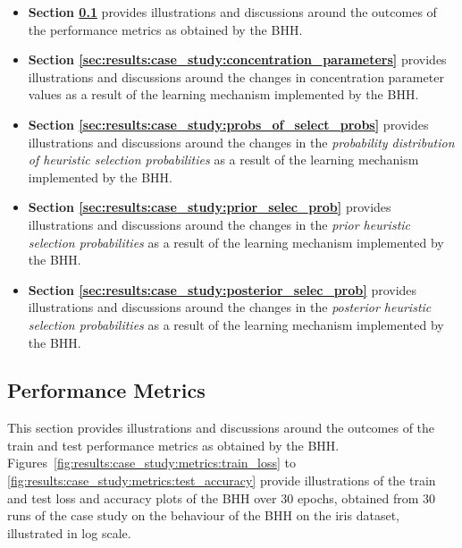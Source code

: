 \begin{itemize}
      \item \textbf{Section \ref{sec:results:case_study:performance_metrics}} provides illustrations and discussions around the outcomes of the performance metrics as obtained by the \acs{BHH}.

      \item \textbf{Section \ref{sec:results:case_study:concentration_parameters}} provides illustrations and discussions around the changes in concentration parameter values as a result of the learning mechanism implemented by the \acs{BHH}.

      \item \textbf{Section \ref{sec:results:case_study:probs_of_select_probs}} provides illustrations and discussions around the changes in the \textit{probability distribution of heuristic selection probabilities} as a result of the learning mechanism implemented by the \acs{BHH}.

      \item \textbf{Section \ref{sec:results:case_study:prior_selec_prob}} provides illustrations and discussions around the changes in the \textit{prior heuristic selection probabilities} as a result of the learning mechanism implemented by the \acs{BHH}.

      \item \textbf{Section \ref{sec:results:case_study:posterior_selec_prob}} provides illustrations and discussions around the changes in the \textit{posterior heuristic selection probabilities} as a result of the learning mechanism implemented by the \acs{BHH}.


\end{itemize}

\subsection{Performance Metrics}\label{sec:results:case_study:performance_metrics}

This section provides illustrations and discussions around the outcomes of the train and test performance metrics as obtained by the \acs{BHH}. Figures~\ref{fig:results:case_study:metrics:train_loss} to \ref{fig:results:case_study:metrics:test_accuracy} provide illustrations of the train and test loss and accuracy plots of the \acs{BHH} over 30 epochs, obtained from 30 runs of the case study on the behaviour of the \acs{BHH} on the iris dataset, illustrated in log scale.

